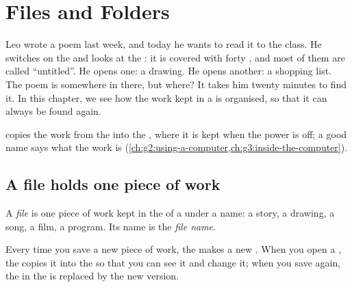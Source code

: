 \chapter{Files and Folders}\label{ch:g3:files-and-folders}

Leo wrote a poem last week, and today he wants to read it to the class. He
switches on the  and looks at the : it is covered with forty
, and most of them are called ``untitled''. He opens one: a drawing. He
opens another: a shopping list. The poem is somewhere in there, but where? It
takes him twenty minutes to find it. In this chapter, we see how the work kept
in a  is organised, so that it can always be found again.

\begin{recall}
 copies the work from the  into the , where it is kept when
the power is off; a good name says what the work is
(\cref{ch:g2:using-a-computer,ch:g3:inside-the-computer}).
\end{recall}

\section{A file holds one piece of work}

\begin{definition}[File]\label{def:g3:files-and-folders:file}
A \emph{file} is one piece of work kept in the  of a
 under a name: a story, a drawing, a song, a film, a program. Its name
is the \emph{file name}.
\end{definition}

Every time you save a new piece of work, the  makes a new . When you
open a , the  copies it into the  so that you can see it and
change it; when you save again, the  in the  is replaced by the new
version.

